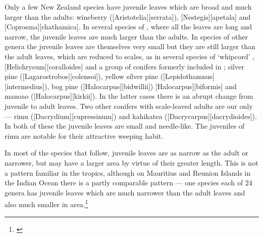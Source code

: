 Only a few New Zealand species have juvenile leaves which are broad and much larger than the adults: wineberry ([Aristotelia][serrata]), [Nestegis][apetala] and [Coprosma][chathamica].
In several species of , where all the leaves are long and narrow, the juvenile leaves are much larger than the adults.
In species of other genera the juvenile leaves are themselves very small but they are still larger than the adult leaves, which are reduced to scales, as in several species of `whipcord' , [Helichrysum][coralloides] and a group of conifers formerly included in ; silver pine ([Lagarostrobos][colensoi]), yellow silver pine ([Lepidothamnus][intermedius]), bog pine ([Halocarpus][bidwillii]) [Halocarpus][biformis] and manoao ([Halocarpus][kirkii]).
In the latter cases there is an abrupt change from juvenile to adult leaves.
Two other conifers with scale-leaved adults are our only  --- rimu ([Dacrydium][cupressinum]) and kahikatea ([Dacrycarpus][dacrydioides]).
In both of these the juvenile leaves are small and needle-like.
The juveniles of rimu are notable for their attractive weeping habit.

In most of the species that follow, juvenile leaves are as narrow as the adult or narrower, but may have a larger area by virtue of their greater length.
This is not a pattern familiar in the tropics, although on Mauritius and Reunion Islands in the Indian Ocean there is a partly comparable pattern --- one species each of 24 genera has juvenile leaves which are much narrower than the adult leaves and also much smaller in area.\footnote{\cite{friedmann1976observations}}

